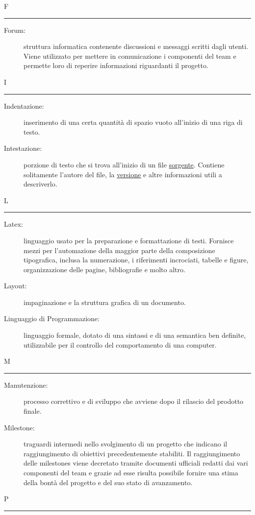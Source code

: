 \documentclass[11pt,a4paper]{article}
\begin{document}
\Huge F \bigskip
\hrule
\smallskip
\normalsize
\begin{description}
	\item[Forum:] struttura informatica contenente discussioni e messaggi scritti dagli utenti. Viene utilizzato per mettere in comunicazione i componenti del team e permette loro di reperire informazioni riguardanti il progetto.
\end{description}
\bigskip
\Huge I \bigskip
\hrule
\smallskip
\normalsize
\begin{description}
	\item[Indentazione:] inserimento di una certa quantità di spazio vuoto all'inizio di una riga di testo.
	\item[Intestazione:] porzione di testo che si trova all'inizio di un file \underline{sorgente}. Contiene solitamente l'autore del file, la \underline{versione} e altre informazioni utili a descriverlo.
\end{description}
\bigskip
\Huge L \bigskip
\hrule
\smallskip
\normalsize
\begin{description}
	\item[Latex:] linguaggio usato per la preparazione e formattazione di testi. Fornisce mezzi per l'automazione della maggior parte della composizione tipografica, inclusa la numerazione, i riferimenti incrociati, tabelle e figure, organizzazione delle pagine, bibliografie e molto altro.
	\item[Layout:] impaginazione e la struttura grafica di un documento.
	\item[Linguaggio di Programmazione:] linguaggio formale, dotato di una sintassi e di una semantica ben definite, utilizzabile per il controllo del comportamento di una computer.
\end{description}
\bigskip
\Huge M \bigskip
\hrule
\smallskip
\normalsize
\begin{description}
	\item[Manutenzione:] processo correttivo e di sviluppo che avviene dopo il rilascio del prodotto finale.
	\item[Milestone:] traguardi intermedi nello svolgimento di un progetto che indicano il raggiungimento di obiettivi precedentemente stabiliti. Il raggiungimento delle milestones viene decretato tramite documenti ufficiali redatti dai vari componenti del team e grazie ad esse risulta possibile fornire una stima della bontà del progetto e del suo stato di avanzamento.
\end{description}
\bigskip
\Huge P \bigskip
\hrule
\smallskip
\normalsize
\end{document}
